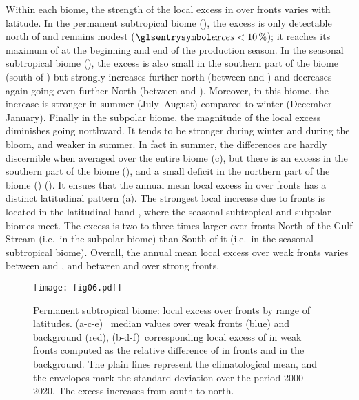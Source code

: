 Within each biome, the strength of the local excess in  over fronts varies with latitude.
In the permanent subtropical biome (), the excess is only detectable north of  and remains modest (\(\am{exces} < \pct{10}\)); it reaches its maximum of  at the beginning and end of the production season.
In the seasonal subtropical biome (), the excess is also small in the southern part of the biome (south of ) but strongly increases further north (between  and ) and decreases again going even further North (between  and ).
Moreover, in this biome, the increase is stronger in summer (July--August) compared to winter (December--January).
Finally in the subpolar biome, the magnitude of the local excess diminishes going northward.
It tends to be stronger during winter and during the bloom, and weaker in summer.
In fact in summer, the differences are hardly discernible when averaged over the entire biome (c), but there is an excess  in the southern part of the biome (), and a small deficit in the northern part of the biome () ().
It ensues that the annual mean local excess in  over fronts has a distinct latitudinal pattern (a).
The strongest local increase due to fronts is located in the latitudinal band , where the seasonal subtropical and subpolar biomes meet.
The excess is two to three times larger over fronts North of the Gulf Stream (i.e.\ in the subpolar biome) than South of it (i.e.\ in the seasonal subtropical biome).
Overall, the annual mean local excess over weak fronts varies between  and , and between  and  over strong fronts.


\begin{figure*}
  \centering
  \texttt{[image: fig06.pdf]}
  \caption[Local impact of front on Chl-\textit{a} in the permanent subtropical biome]{
    Permanent subtropical biome: local  excess over fronts by range of latitudes.
    (a-c-e)~ median values over weak fronts (blue) and background (red), (b-d-f)~corresponding local excess of  in weak fronts computed as the relative difference of  in fronts and in the background.
    The plain lines represent the climatological mean, and the envelopes mark the standard deviation over the period 2000--2020.
    The excess increases from south to north.
  }%
  \label{fig:latbands-s}
\end{figure*}

